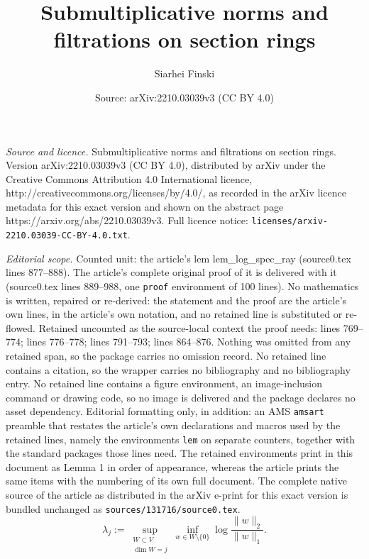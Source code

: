 \documentclass[10pt,a4paper]{amsart}
\title{\vspace*{-1.5cm} Submultiplicative norms and filtrations on section rings}
\author{Siarhei Finski}
\date{Source: arXiv:2210.03039v3 (CC BY 4.0)}
\begin{document}
\maketitle

\noindent\emph{Source and licence.} \vspace*{-1.5cm} Submultiplicative norms and filtrations on section rings. Version arXiv:2210.03039v3 (CC BY 4.0), distributed by arXiv under the Creative Commons Attribution 4.0 International licence, http://creativecommons.org/licenses/by/4.0/, as recorded in the arXiv licence metadata for this exact version and shown on the abstract page https://arxiv.org/abs/2210.03039v3. Full licence notice: \texttt{licenses/arxiv-2210.03039-CC-BY-4.0.txt}.\par\smallskip

\noindent\textit{Editorial scope.} Counted unit: the article's lem lem\_log\_spec\_ray (source0.tex lines 877--888). The article's complete original proof of it is delivered with it (source0.tex lines 889--988, one \texttt{proof} environment of 100 lines). No mathematics is written, repaired or re-derived: the statement and the proof are the article's own lines, in the article's own notation, and no retained line is substituted or re-flowed.  Retained uncounted as the source-local context the proof needs: lines 769--774; lines 776--778; lines 791--793; lines 864--876.  Nothing was omitted from any retained span, so the package carries no omission record.  No retained line contains a citation, so the wrapper carries no bibliography and no bibliography entry.  No retained line contains a figure environment, an image-inclusion command or drawing code, so no image is delivered and the package declares no asset dependency.  Editorial formatting only, in addition: an AMS \texttt{amsart} preamble that restates the article's own declarations and macros used by the retained lines, namely the environments \texttt{lem} on separate counters, together with the standard packages those lines need.  The retained environments print in this document as Lemma 1 in order of appearance, whereas the article prints the same items with the numbering of its own full document.  The complete native source of the article as distributed in the arXiv e-print for this exact version is bundled unchanged as \texttt{sources/131716/source0.tex}.
	\begin{equation}\label{eq_log_rel_spec}
		\lambda_j
		:=
		\sup_{\substack{W \subset V \\ \dim W = j}} 
		\inf_{w \in W \setminus \{0\}} \log \frac{\| w \|_2}{\| w \|_1}.
	\end{equation}
\end{document}

